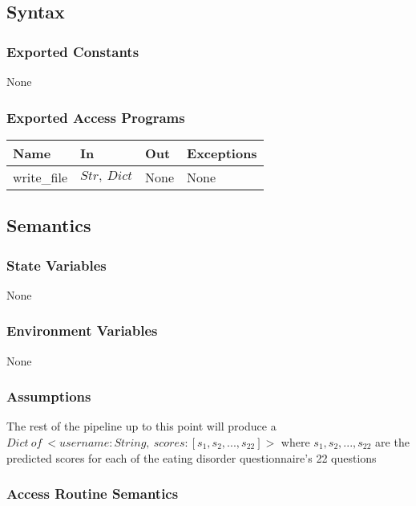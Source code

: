 \documentclass[12pt, titlepage]{article}
\begin{document}
\subsection{Syntax}

\subsubsection{Exported Constants}

None

\subsubsection{Exported Access Programs}

\begin{center}
\begin{tabular}{p{2cm} p{4cm} p{4cm} p{3cm}}
\hline
\textbf{Name} & \textbf{In} & \textbf{Out} & \textbf{Exceptions} \\
\hline
write\_file & $Str,\ Dict$ & None & None \\
\hline
\end{tabular}
\end{center}

\subsection{Semantics}

\subsubsection{State Variables}

None

\subsubsection{Environment Variables}

None

\subsubsection{Assumptions}

The rest of the pipeline up to this point will produce a $Dict\ of\ <username: String,\ scores: [s_1, s_2, ..., s_{22}]>$ where $s_1, s_2, ..., s_{22}$ are the predicted scores for each of the eating disorder questionnaire's 22 questions

\subsubsection{Access Routine Semantics}
\end{document}
